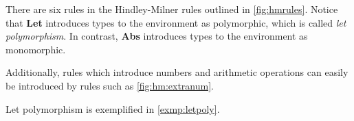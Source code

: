 \documentclass[11pt,oneside,a4paper]{report}
\begin{document}
There are six rules in the Hindley-Milner rules outlined in \autoref{fig:hmrules}.
Notice that \textbf{Let} introduces types to the environment as polymorphic, which is called \textit{let polymorphism}.
In contrast, \textbf{Abs} introduces types to the environment as monomorphic.

Additionally, rules which introduce numbers and arithmetic operations can easily be introduced by rules such as \autoref{fig:hm:extranum}.
\begin{figure}
  \begin{mdframed}
    \begin{subfigure}[b]{0.60\textwidth}
    \begin{prooftree}
    \end{prooftree}
    \end{subfigure}
    \begin{subfigure}[b]{0.38\textwidth}
    \begin{prooftree}
    \end{prooftree}
    \end{subfigure}
  \end{mdframed}
  \caption{}
  \label{fig:hm:extranum}
\end{figure}
Let polymorphism is exemplified in \autoref{exmp:letpoly}.
\end{document}
